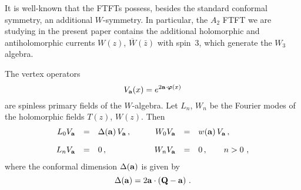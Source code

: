 \documentclass[a4paper,12pt]{article}
\newcommand{\bm}{\boldsymbol}
\begin{document}
It is well-known that the FTFTs 
possess, besides the standard conformal symmetry, an 
additional $W$-symmetry. In particular,  the $A_2$ FTFT  we are studying in the
present paper contains the additional holomorphic and antiholomorphic currents
$W(z)$, $\overline W(\bar z)$ with spin~3, which generate the $W_3$ algebra.

The vertex operators
$$
V_{\bf a}(x)=e^{2{\bf a}\cdot{\bm\varphi}(x)}
$$
are spinless primary fields of the $W$-algebra.
Let $L_n$, $W_n$ be the Fourier modes of the holomorphic fields
$T(z)$, $W(z)$.
Then
\begin{eqnarray*}	
\begin{array}{rcl rrl}
L_0 V_{\bf a} &=&\Delta({\bf a})\, V_{\bf a}\,,\qquad&
W_0 V_{\bf a} &=&w({\bf a})\, V_{\bf a}\,,\\[10pt]
L_n V_{\bf a} &=&0\,,\qquad&
W_n V_{\bf a} &=&0\,,\qquad n>0~,
\end{array}
\end{eqnarray*}
where the conformal dimension $\Delta({\bf a})$  
is given by
$$
\Delta({\bf a})=2{\bf a}\cdot({\bf Q}-{\bf a})~.
$$
\end{document}
